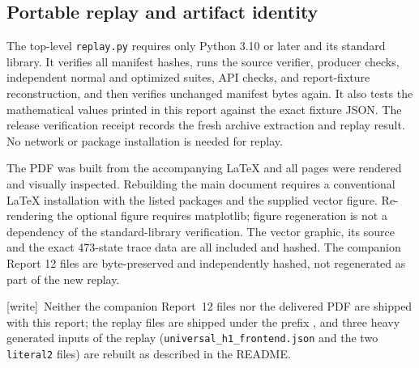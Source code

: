 \documentclass[11pt,a4paper]{article}
\numberwithin{equation}{section}
\newcommand{\wtag}{\textup{[write]}}
\begin{document}
\subsection{Portable replay and artifact identity}
The top-level \texttt{replay.py} requires only Python 3.10 or later and its
standard library. It verifies all manifest hashes, runs the source verifier,
producer checks, independent normal and optimized suites, API checks, and
report-fixture reconstruction, and then verifies unchanged manifest bytes
again. It also tests the mathematical values printed in this report against
the exact fixture JSON. The release verification receipt records the fresh
archive extraction and replay result. No network or package installation is
needed for replay.

The PDF was built from the accompanying LaTeX and all pages were rendered
and visually inspected. Rebuilding the main document requires a conventional
LaTeX installation with the listed packages and the supplied vector figure.
Re-rendering the optional figure requires matplotlib; figure regeneration is
not a dependency of the standard-library verification. The vector graphic,
its source and the exact 473-state trace data are all included and hashed.
The companion Report 12 files are byte-preserved and independently hashed,
not regenerated as part of the new replay.

\wtag\ Neither the companion Report~12 files nor the delivered PDF are shipped with this report; the replay files are shipped under the prefix , and three heavy generated inputs of the replay (\texttt{universal\_h1\_frontend.json} and the two \texttt{literal2} files) are rebuilt as described in the README.
\end{document}
